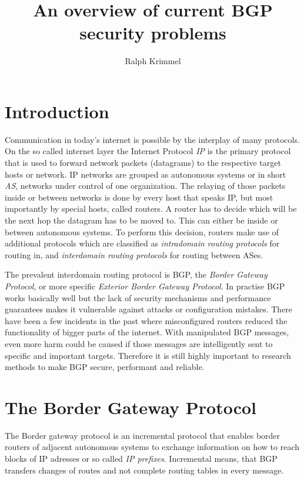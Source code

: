 \documentclass[12pt]{IEEEtran}
\author{Ralph Krimmel}
\title{An overview of current BGP security problems}
\begin{document}
	\maketitle
	\begin{abstract}
	\end{abstract}
	\section{Introduction}
	Communication in today's internet is possible by the interplay of many protocols. 
	On the so called internet layer the Internet Protocol \emph{IP} is the primary protocol that is used to forward network packets (datagrams) to the respective target hosts or network. 
	IP networks are grouped as autonomous systems or in short \emph{AS}, networks under control of one organization. 
	The relaying of those packets inside or between networks is done by every host that speaks IP, but most importantly by special hosts, called routers. 
	A router has to decide which will be the next hop the datagram has to be moved to. 
	This can either be inside or between autonomous systems. 
	To perform this decision, routers make use of additional protocols which are classified as \emph{intradomain routing protocols} for routing in, and \emph{interdomain routing protocols} for routing between ASes. 

	The prevalent interdomain routing protocol is BGP, the \emph{Border Gateway Protocol}, or more specific \emph{Exterior Border Gateway Protocol}. 
	In practise BGP works basically well but the lack of security mechanisms and performance guarantees makes it vulnerable against attacks or configuration mistakes. 
	There have been a few incidents in the past where misconfigured routers reduced the functionality of bigger parts of the internet. 
	With manipulated BGP messages, even more harm could be caused if those messages are intelligently sent to specific and important targets. 
	Therefore it is still highly important to research methods to make BGP secure, performant and reliable. 

	\section{The Border Gateway Protocol}
	The Border gateway protocol is an incremental protocol that enables border routers of adjacent autonomous systems to exchange information on how to reach blocks of IP adresses or so called \emph{IP prefixes}. 
	Incremental means, that BGP transfers changes of routes and not complete routing tables in every message.
\end{document}
